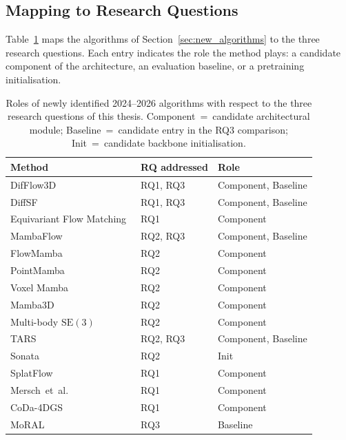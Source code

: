 \subsection{Mapping to Research Questions}
\label{sec:new_algorithms:mapping}

Table~\ref{tab:new_algorithms_rq} maps the algorithms of Section~\ref{sec:new_algorithms} to the three research questions. Each entry indicates the role the method plays: a candidate component of the architecture, an evaluation baseline, or a pretraining initialisation.

\begin{table}[ht]
\centering
\caption{Roles of newly identified 2024--2026 algorithms with respect to the three research questions of this thesis. Component~=~candidate architectural module; Baseline~=~candidate entry in the RQ3 comparison; Init~=~candidate backbone initialisation.}
\label{tab:new_algorithms_rq}
\small
\begin{tabular}{l l l}
\toprule
Method & RQ addressed & Role \\
\midrule
DifFlow3D~\cite{liu2024difflow3d}                & RQ1, RQ3 & Component, Baseline \\
DiffSF~\cite{zhang2024diffsf}                    & RQ1, RQ3 & Component, Baseline \\
Equivariant Flow Matching~\cite{wang2025eqflowmatching} & RQ1 & Component \\
MambaFlow~\cite{ma2025mambaflow}                 & RQ2, RQ3 & Component, Baseline \\
FlowMamba~\cite{liu2024flowmamba}                & RQ2 & Component \\
PointMamba~\cite{liang2024pointmamba}            & RQ2 & Component \\
Voxel Mamba~\cite{nguyen2024voxelmamba}          & RQ2 & Component \\
Mamba3D~\cite{han2024mamba3d}                    & RQ2 & Component \\
Multi-body $\mathrm{SE}(3)$~\cite{liu2024multibodyse3} & RQ2 & Component \\
TARS~\cite{wu2025tars}                           & RQ2, RQ3 & Component, Baseline \\
Sonata~\cite{wu2025sonata}                       & RQ2 & Init \\
SplatFlow~\cite{sun2025splatflow}                & RQ1 & Component \\
Mersch~et~al.~\cite{mersch2024fourdinr}          & RQ1 & Component \\
CoDa-4DGS~\cite{song2025coda4dgs}                & RQ1 & Component \\
MoRAL~\cite{lin2025moral}                        & RQ3 & Baseline \\
\bottomrule
\end{tabular}
\end{table}

